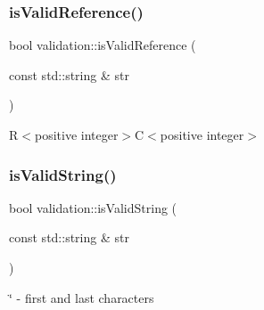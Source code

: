 \subsubsection{\texorpdfstring{is\+Valid\+Reference()}{isValidReference()}}
{\footnotesize\ttfamily bool validation\+::is\+Valid\+Reference (\begin{DoxyParamCaption}\item[{const std\+::string \&}]{str }\end{DoxyParamCaption})}

R$<$positive integer$>$C$<$positive integer$>$ \mbox{\label{namespacevalidation_a651f07800d4dfd07e28ea5b6fb988bf6}} 
\subsubsection{\texorpdfstring{is\+Valid\+String()}{isValidString()}}
{\footnotesize\ttfamily bool validation\+::is\+Valid\+String (\begin{DoxyParamCaption}\item[{const std\+::string \&}]{str }\end{DoxyParamCaption})}

\textquotesingle{}\char`\"{}\textquotesingle{} -\/ first and last characters 